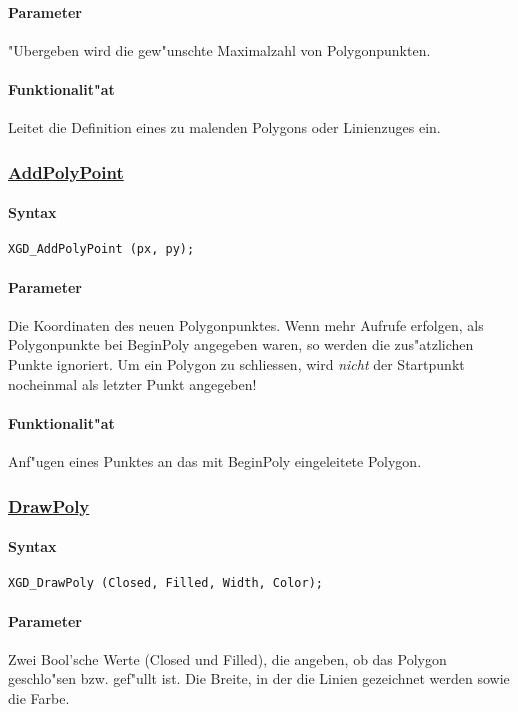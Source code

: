 \paragraph{Parameter}
"Ubergeben wird die gew"unschte Maximalzahl von Polygonpunkten.

\paragraph{Funktionalit"at}
Leitet die Definition eines zu malenden Polygons oder Linienzuges ein.

\subsubsection{\underline{AddPolyPoint}}

\paragraph{Syntax}
\begin{verbatim}
XGD_AddPolyPoint (px, py);
\end{verbatim}

\paragraph{Parameter}
Die Koordinaten des neuen Polygonpunktes. Wenn mehr Aufrufe erfolgen, als
Polygonpunkte bei BeginPoly angegeben waren, so werden die zus"atzlichen
Punkte ignoriert. Um ein Polygon zu schliessen, wird {\em nicht} der Startpunkt
nocheinmal als letzter Punkt angegeben!

\paragraph{Funktionalit"at}
Anf"ugen eines Punktes an das mit BeginPoly eingeleitete Polygon.

\subsubsection{\underline{DrawPoly}}

\paragraph{Syntax}
\begin{verbatim}
XGD_DrawPoly (Closed, Filled, Width, Color);
\end{verbatim}

\paragraph{Parameter}
Zwei Bool'sche Werte (Closed und Filled), die angeben, ob das Polygon
geschlo"sen bzw. gef"ullt ist. Die Breite, in der die Linien gezeichnet
werden sowie die Farbe.

